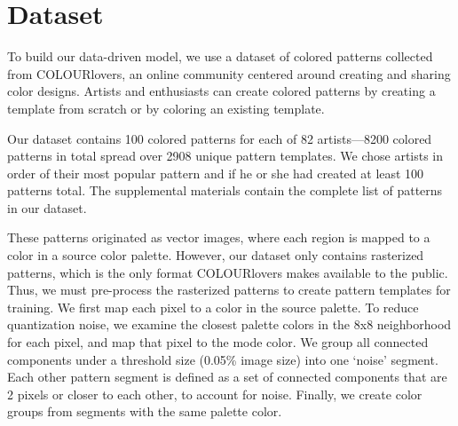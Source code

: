 \section{Dataset}
\label{sec:dataset}

To build our data-driven model, we use a dataset of colored patterns collected from COLOURlovers, an online community centered around creating and sharing color designs. Artists and enthusiasts can create colored patterns by creating a template from scratch or by coloring an existing template. 

Our dataset contains 100 colored patterns for each of 82 artists---8200 colored patterns in total spread over 2908 unique pattern templates. We chose artists in order of their most popular pattern and if he or she had created at least 100 patterns total. The supplemental materials contain the complete list of patterns in our dataset.

These patterns originated as vector images, where each region is mapped to a color in a source color palette. However, our dataset only contains rasterized patterns, which is the only format COLOURlovers makes available to the public. Thus, we must pre-process the rasterized patterns to create pattern templates for training. We first map each pixel to a color in the source palette. To reduce quantization noise, we examine the closest palette colors in the 8x8 neighborhood for each pixel, and map that pixel to the mode color. We group all connected components under a threshold size (0.05\% image size) into one `noise' segment. Each other pattern segment is defined as a set of connected components that are 2 pixels or closer to each other, to account for noise. Finally, we create color groups from segments with the same palette color.